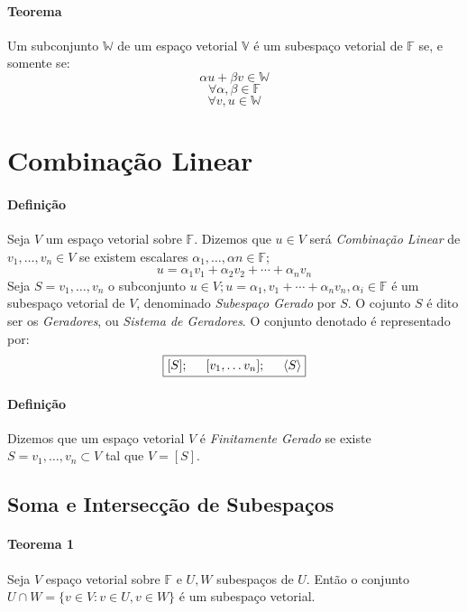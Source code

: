 \documentclass{article}
\begin{document}
            \paragraph{Teorema}Um subconjunto $\mathbb{W}$ de um espaço vetorial $\mathbb{V}$ é um subespaço vetorial de $\mathbb{F}$ se, e somente se:
                \[\alpha u + \beta v \in \mathbb{W}\] \[\forall \alpha,\beta \in \mathbb{F}\] \[\forall v, u \in \mathbb{W}\]
\newpage

    \section{Combinação Linear}
        \paragraph{Definição}Seja $V$ um espaço vetorial sobre $\mathbb{F}$. Dizemos que $u\in V$ será \textit{Combinação Linear} de $v_{1}, \dots, v_{n} \in V$ se existem escalares $\alpha_{1}, \dots, \alpha{n} \in \mathbb{F};$
            \[u = \alpha_{1}v_{1} + \alpha_{2}v_{2} + \cdots + \alpha_{n}v_{n}\]
        Seja $S={v_{1},\dots,v_{n}}$ o subconjunto ${u \in V; u=\alpha_{1},v_{1}+\cdots+\alpha_{n}v_{n}, \alpha_{i}\in\mathbb{F}}$ é um subespaço vetorial de $V$, denominado \textit{Subespaço Gerado} por $S$. O cojunto $S$ é dito ser os \textit{Geradores}, ou \textit{Sistema de Geradores}. O conjunto denotado é representado por:
            \[\boxed{[S]; \hspace{5mm} [v_{1},\dots v_{n}]; \hspace{5mm} \langle S\rangle}\]

        \paragraph{Definição}Dizemos que um espaço vetorial $V$ é \textit{Finitamente Gerado} se existe $S={v_{1},\dots,v_{n}}\subset V$ tal que $V=[S]$.

        \subsection{Soma e Intersecção de Subespaços}
            \paragraph{Teorema 1}Seja $V$ espaço vetorial sobre $\mathbb{F}$ e $U, W$ subespaços de $U$. Então o conjunto $U\cap W =\{v\in V: v\in U, v\in W\}$ é um subespaço vetorial.
\end{document}

